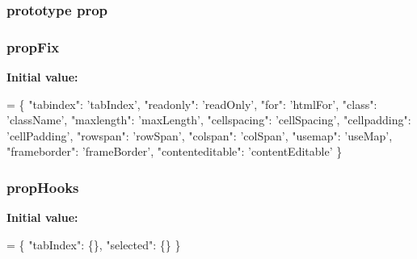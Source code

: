 \subsubsection[{\texorpdfstring{prop}{prop}}]{ {\bf prototype} prop}\hypertarget{jquery-2_82_81-vsdoc_8js_af17be84954030af6c2286f5da385d41b}{}\label{jquery-2_82_81-vsdoc_8js_af17be84954030af6c2286f5da385d41b}
\subsubsection[{\texorpdfstring{prop\+Fix}{propFix}}]{ prop\+Fix}\hypertarget{jquery-2_82_81-vsdoc_8js_acdf840d8414190fd915ee5b9cc2fb8c5}{}\label{jquery-2_82_81-vsdoc_8js_acdf840d8414190fd915ee5b9cc2fb8c5}
{\bfseries Initial value\+:}
\begin{DoxyCode}
= \{
        \textcolor{stringliteral}{"tabindex"}: \textcolor{stringliteral}{'tabIndex'},
        \textcolor{stringliteral}{"readonly"}: \textcolor{stringliteral}{'readOnly'},
        \textcolor{stringliteral}{"for"}: \textcolor{stringliteral}{'htmlFor'},
        \textcolor{stringliteral}{"class"}: \textcolor{stringliteral}{'className'},
        \textcolor{stringliteral}{"maxlength"}: \textcolor{stringliteral}{'maxLength'},
        \textcolor{stringliteral}{"cellspacing"}: \textcolor{stringliteral}{'cellSpacing'},
        \textcolor{stringliteral}{"cellpadding"}: \textcolor{stringliteral}{'cellPadding'},
        \textcolor{stringliteral}{"rowspan"}: \textcolor{stringliteral}{'rowSpan'},
        \textcolor{stringliteral}{"colspan"}: \textcolor{stringliteral}{'colSpan'},
        \textcolor{stringliteral}{"usemap"}: \textcolor{stringliteral}{'useMap'},
        \textcolor{stringliteral}{"frameborder"}: \textcolor{stringliteral}{'frameBorder'},
        \textcolor{stringliteral}{"contenteditable"}: \textcolor{stringliteral}{'contentEditable'}
    \}
\end{DoxyCode}
\subsubsection[{\texorpdfstring{prop\+Hooks}{propHooks}}]{ prop\+Hooks}\hypertarget{jquery-2_82_81-vsdoc_8js_a6bf604bb8f2c26858d3e413ccebaa079}{}\label{jquery-2_82_81-vsdoc_8js_a6bf604bb8f2c26858d3e413ccebaa079}
{\bfseries Initial value\+:}
\begin{DoxyCode}
= \{
        \textcolor{stringliteral}{"tabIndex"}: \{\},
        \textcolor{stringliteral}{"selected"}: \{\}
    \}
\end{DoxyCode}
